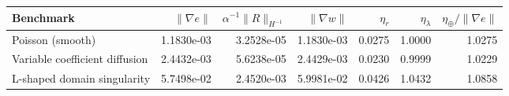 \begin{tabular}{lrrrrrr}
\toprule
Benchmark & $\|\nabla e\|$ & $\alpha^{-1}\|R\|_{H^{-1}}$ & $\|\nabla w\|$ & $\eta_r$ & $\eta_\lambda$ & $\eta_\oplus/\|\nabla e\|$ \\
\midrule
Poisson (smooth) & 1.1830e-03 & 3.2528e-05 & 1.1830e-03 & 0.0275 & 1.0000 & 1.0275 \\
Variable coefficient diffusion & 2.4432e-03 & 5.6238e-05 & 2.4429e-03 & 0.0230 & 0.9999 & 1.0229 \\
L-shaped domain singularity & 5.7498e-02 & 2.4520e-03 & 5.9981e-02 & 0.0426 & 1.0432 & 1.0858 \\
\bottomrule
\end{tabular}
